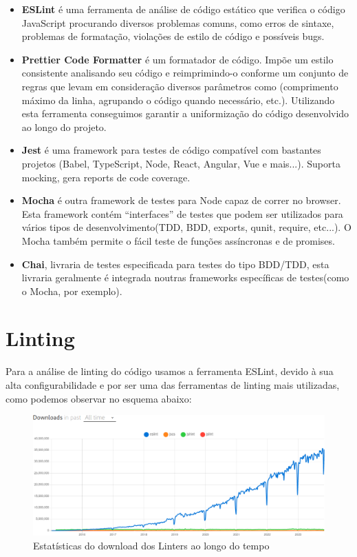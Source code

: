 \documentclass[a4paper,12pt]{article} %
\begin{document}
\begin{itemize}
	\item \textbf{ESLint} é uma ferramenta de análise de código estático que verifica o código JavaScript procurando diversos problemas comuns, como erros de sintaxe, problemas de formatação, violações de estilo de código e possíveis bugs.

	\item \textbf{Prettier Code Formatter} é um formatador de código. Impõe um estilo consistente analisando seu código e reimprimindo-o conforme um conjunto de regras que levam em consideração diversos parâmetros como (comprimento máximo da linha, agrupando o código quando necessário, etc.). Utilizando esta ferramenta conseguimos garantir a uniformização do código desenvolvido ao longo do projeto.

	\item \textbf{Jest} é uma framework para testes de código compatível com bastantes projetos (Babel, TypeScript, Node, React, Angular, Vue e mais...). Suporta mocking, gera reports de code coverage.

	\item \textbf{Mocha} é outra framework de testes para Node capaz de correr no browser. Esta framework contém “interfaces” de testes que podem ser utilizados para vários tipos de desenvolvimento(TDD, BDD, exports, qunit, require, etc...). O Mocha também permite o fácil teste de funções assíncronas e de promises.

	\item \textbf{Chai}, livraria de testes especificada para testes do tipo BDD/TDD, esta livraria geralmente é integrada noutras frameworks específicas de testes(como o Mocha, por exemplo).
\end{itemize}

\newpage
\section{Linting}
Para a análise de linting do código usamos a ferramenta ESLint, devido à sua alta configurabilidade e por ser uma das ferramentas de linting mais utilizadas, como podemos observar no esquema abaixo:

\vspace{1cm}
\begin{figure}[H]
	\centering
	\includegraphics[scale=1.5]{images/lintTrend.png}
	\caption[Estatísticas de Download de Linters]{Estatísticas do download dos Linters ao longo do tempo\footnotemark}
\end{figure}
\end{document}
